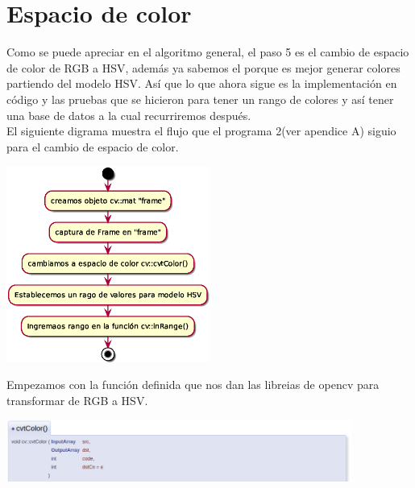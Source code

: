 
\section{Espacio de color}
Como se puede apreciar en el algoritmo general, el paso 5 es el cambio de espacio de color
de RGB a HSV, además ya sabemos el porque es mejor generar colores partiendo del
modelo HSV. Así que lo que ahora sigue es la implementación en código y las pruebas
que se hicieron para tener un rango de colores y así tener una base de datos a la
cual recurriremos después.\\
El siguiente digrama muestra el flujo que el programa 2(ver apendice A) siguio para
el cambio de espacio de color.
\begin{center}
	\includegraphics[width=0.5\textwidth]{Contenido/Cuerpo/Capitulo4/color.eps}
	\label{color}
\end{center}
Empezamos con la función definida que nos dan las libreias de opencv para transformar
de RGB a HSV.
\begin{center}
	\includegraphics[width=0.85\textwidth]{Contenido/Cuerpo/Capitulo4/Fig2.eps}
	\label{Fig2}
\end{center}

